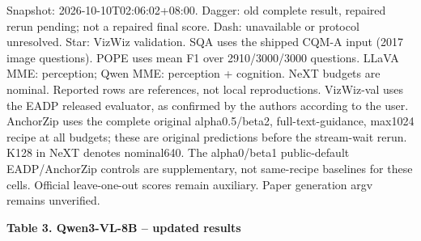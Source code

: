 \documentclass[10pt,a4paper]{article}
\begin{document}
{\footnotesize Snapshot: 2026-10-10T02:06:02+08:00. Dagger: old complete result, repaired rerun pending; not a repaired final score. Dash: unavailable or protocol unresolved. Star: VizWiz validation. SQA uses the shipped CQM-A input (2017 image questions). POPE uses mean F1 over 2910/3000/3000 questions. LLaVA MME: perception; Qwen MME: perception + cognition. NeXT budgets are nominal. Reported rows are references, not local reproductions. VizWiz-val uses the EADP released evaluator, as confirmed by the authors according to the user. AnchorZip uses the complete original alpha0.5/beta2, full-text-guidance, max1024 recipe at all budgets; these are original predictions before the stream-wait rerun. K128 in NeXT denotes nominal640. The alpha0/beta1 public-default EADP/AnchorZip controls are supplementary, not same-recipe baselines for these cells. Official leave-one-out scores remain auxiliary. Paper generation argv remains unverified.\par}
\newpage
{\large\textbf{Table 3. Qwen3-VL-8B -- updated results}}\par\medskip
\begingroup\setlength{\tabcolsep}{3.2pt}\renewcommand{\arraystretch}{1.03}
\end{document}
